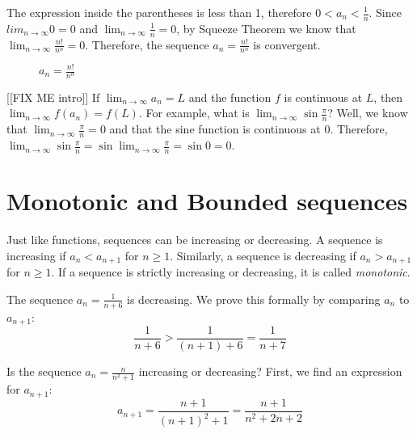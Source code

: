 The expression inside the parentheses is less than 1, therefore $0 < 
a_n < \frac{1}{n}$. Since $lim_{n \to \infty} 0 = 0$ and $\lim_{n \to 
\infty} \frac{1}{n} = 0$, by Squeeze Theorem we know that $\lim_{n 
\to \infty} \frac{n!}{n^n} = 0$. Therefore, the sequence $a_n = 
\frac{n!}{n^n}$ is convergent. 

\begin{figure}[htbp]
\centering
    \caption{$a_n = \frac{n!}{n^n}$}
    \label{fig:factorial}
\end{figure}

[[FIX ME intro]]
If $\lim_{n \to \infty} a_n = L$ and the function $f$ is continuous 
at $L$, then $\lim_{n \to \infty} f(a_n) = f(L)$. For example, what 
is $\lim_{n \to \infty} \sin{\frac{\pi}{n}}$? Well, we know that 
$\lim_{n \to \infty} \frac{\pi}{n} = 0$ and that the sine function is 
continuous at 0. Therefore, $\lim_{n \to \infty} \sin{\frac{\pi}{n}} 
= \sin{\lim_{n \to \infty} \frac{\pi}{n}} = \sin{0} = 0$. 

\section{Monotonic and Bounded sequences}
Just like functions, sequences can be increasing or decreasing. A sequence is increasing if $a_n < a_{n+1}$ for $n \geq 1$. Similarly, a sequence is decreasing if $a_n > a_{n+1}$ for $n \geq 1$. If a sequence is strictly increasing or decreasing, it is called \textit{monotonic}. 

The sequence $a_n = \frac{1}{n + 6}$ is decreasing. We prove this formally by comparing $a_n$ to $a_{n+1}$:
$$\frac{1}{n + 6} > \frac{1}{(n + 1) + 6} = \frac{1}{n + 7}$$

Is the sequence $a_n = \frac{n}{n^2 + 1}$ increasing or decreasing? First, we find an expression for $a_{n+1}$:
$$a_{n + 1} = \frac{n + 1}{(n + 1)^2 + 1} = \frac{n + 1}{n^2 + 2n + 2}$$

